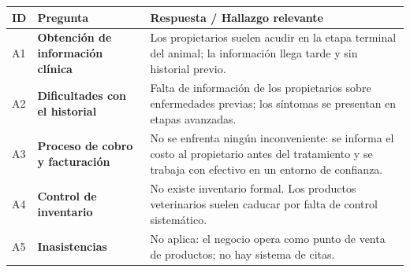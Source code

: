 \documentclass[
]{article}
\newcounter{none} %
\begin{document}
{\def\LTcaptype{none} %
\begin{longtable}[]{|
  >{\centering\arraybackslash}p{}|
  >{\raggedright\arraybackslash}p{}|
  >{\raggedright\arraybackslash}p{}|}
\hline
\begin{minipage}[b]{\linewidth}\centering
\textbf{ID}
\end{minipage} & \begin{minipage}[b]{\linewidth}\centering
\textbf{Pregunta}
\end{minipage} & \begin{minipage}[b]{\linewidth}\raggedright
\textbf{Respuesta / Hallazgo relevante}
\end{minipage} \\
\hline
\endhead
\hline
\endlastfoot
A1 & \textbf{Obtención de información clínica} &
\begin{minipage}[t]{\linewidth}\raggedright
Los propietarios suelen acudir en la etapa terminal del animal; la
información llega tarde y sin historial previo.
\end{minipage} \\
\hline
A2 & \textbf{Dificultades con el historial} &
\begin{minipage}[t]{\linewidth}\raggedright
Falta de información de los propietarios sobre enfermedades previas; los
síntomas se presentan en etapas avanzadas.
\end{minipage} \\
\hline
A3 & \textbf{Proceso de cobro y facturación} &
\begin{minipage}[t]{\linewidth}\raggedright
No se enfrenta ningún inconveniente: se informa el costo al propietario
antes del tratamiento y se trabaja con efectivo en un entorno de
confianza.
\end{minipage} \\
\hline
A4 & \textbf{Control de inventario} &
\begin{minipage}[t]{\linewidth}\raggedright
No existe inventario formal. Los productos veterinarios suelen caducar
por falta de control sistemático.
\end{minipage} \\
\hline
A5 & \textbf{Inasistencias} &
\begin{minipage}[t]{\linewidth}\raggedright
No aplica: el negocio opera como punto de venta de productos; no hay
sistema de citas.
\end{minipage} \\
\hline
\end{longtable}
}
\end{document}

